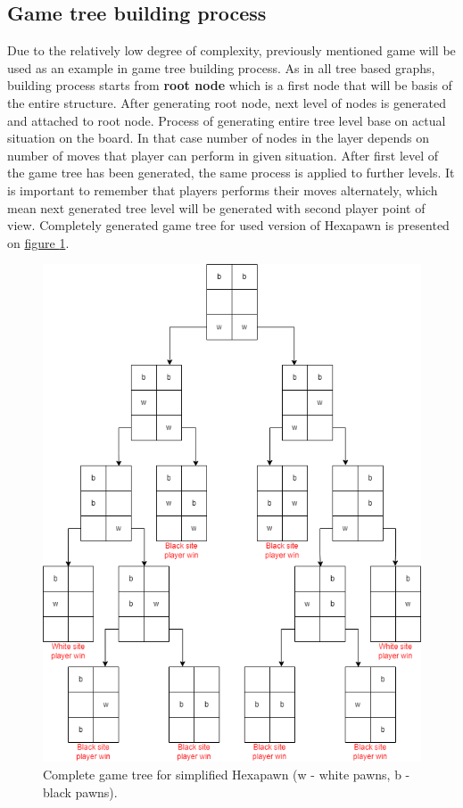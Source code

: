     \subsection{Game tree building process}
    Due to the relatively low degree of complexity, previously mentioned game will be used as an example in game tree building process. As in all tree based graphs, building process starts from \textbf{root node} which is a first node that will be basis of the entire structure. After generating root node, next level of nodes is generated and attached to root node. Process of generating entire tree level base on actual situation on the board. In that case number of nodes in the layer depends on number of moves that player can perform in given situation. After first level of the game tree has been generated, the same process is applied to further levels. It is important to remember that players performs their moves alternately, which mean next generated tree level will be generated with second player point of view. Completely generated game tree for used version of Hexapawn is presented on \hyperref[fig:complete-game-tree-hexapawn]{figure \ref*{fig:complete-game-tree-hexapawn}}.
    \begin{figure}
        \centering
        \includegraphics[width=\textwidth]{dependencies/pictures/Complete_Game_Tree.png}
        \caption{Complete game tree for simplified Hexapawn (w - white pawns, b - black pawns).}
        \label{fig:complete-game-tree-hexapawn}
    \end{figure}
